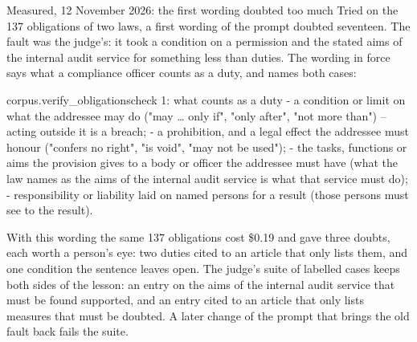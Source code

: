 \begin{lessonbox}{Measured, 12 November 2026: the first wording doubted too much}
Tried on the 137 obligations of two laws, a first wording of the prompt doubted seventeen.
The fault was the judge's: it took a condition on a permission and the stated aims of the
internal audit service for something less than duties. The wording in force says what a
compliance officer counts as a duty, and names both cases:

\begin{promptexcerpt}{corpus.verify_obligations}{check 1: what counts as a duty}
   - a condition or limit on what the addressee may do ("may … only if", "only after", "not more than") – acting outside it is a breach;
   - a prohibition, and a legal effect the addressee must honour ("confers no right", "is void", "may not be used");
   - the tasks, functions or aims the provision gives to a body or officer the addressee must have (what the law names as the aims of the internal audit service is what that service must do);
   - responsibility or liability laid on named persons for a result (those persons must see to the result).
\end{promptexcerpt}

With this wording the same 137 obligations cost \$0.19 and gave three doubts, each worth a
person's eye: two duties cited to an article that only lists them, and one condition the
sentence leaves open. The judge's suite of labelled cases keeps both sides of the lesson: an
entry on the aims of the internal audit service that must be found supported, and an entry
cited to an article that only lists measures that must be doubted. A later change of the
prompt that brings the old fault back fails the suite.
\end{lessonbox}

